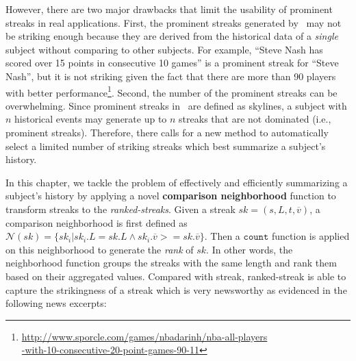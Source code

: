 %
However, there are two major drawbacks that limit the usability
of prominent streaks in real applications.
First, the prominent streaks generated by~\cite{zhang2014discovering} may not be striking enough because they are derived from the historical data of a \emph{single} subject without comparing to other subjects.
For example, 
``Steve Nash has scored over 15 points in consecutive 10 games'' is a prominent streak for ``Steve Nash'', but it is not striking given the fact that there are more than 90 players with better performance\footnote{\url{http://www.sporcle.com/games/nbadarinh/nba-all-players} \\ \url{-with-10-consecutive-20-point-games-90-11}}. 
Second, the number of the prominent streaks can be overwhelming. 
Since prominent streaks in~\cite{zhang2014discovering} are defined as skylines,
a subject with $n$ historical events may generate up to $n$ streaks that are not dominated (i.e., prominent streaks).
Therefore, there calls for a new method to automatically select a limited number of striking streaks which best summarize a subject's history.

In this chapter, we tackle the problem of effectively and efficiently 
summarizing a subject's history by
applying a novel \textbf{comparison neighborhood} function to transform streaks to the \emph{ranked-streaks}. 
Given a streak $sk=(s,L,t,\overline{v})$, a comparison neighborhood is first defined as $\mathcal{N}(sk) = \{sk_i | sk_i.L = sk.L \wedge sk_i.\overline{v} >= sk.\overline{v}\}$. Then a $\mathtt{count}$ function
is applied on this neighborhood to generate the \emph{rank} of $sk$. 
In other words, the neighborhood function groups 
the streaks with the same length and rank them based on their aggregated values. 
Compared with streak, ranked-streak is able to capture the strikingness of a streak 
which is very newsworthy as evidenced in the following news excerpts:

